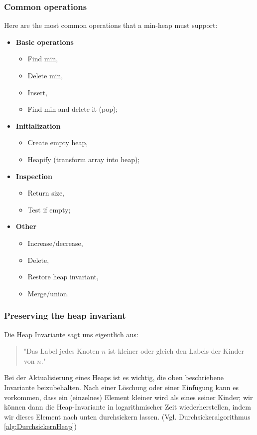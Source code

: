 \documentclass[a4paper]{article}
\begin{document}
\subsubsection*{Common operations} \label{common operations}
Here are the most common operations that a min-heap must support:
\begin{itemize}
\item \textbf{Basic operations}
  \begin{itemize}
  \item Find min,
  \item Delete min,
  \item Insert,
  \item Find min and delete it (pop);
  \end{itemize}
\item \textbf{Initialization}
  \begin{itemize}
  \item Create empty heap,
  \item Heapify (transform array into heap);
  \end{itemize}
\item\textbf{Inspection}
  \begin{itemize}
  \item Return size,
  \item Test if empty;
  \end{itemize}
\item \textbf{Other}
  \begin{itemize}
  \item Increase/decrease,
  \item Delete,
  \item Restore heap invariant,
  \item Merge/union.
  \end{itemize}
\end{itemize}


\subsubsection*{Preserving the heap invariant}
Die Heap Invariante sagt uns eigentlich aus: 
\begin{quote}
    "Das Label jedes Knoten $n$ ist kleiner oder gleich den Labels der Kinder von $n$."
\end{quote}
Bei der Aktualisierung eines Heaps ist es wichtig, die oben beschriebene Invariante beizubehalten. Nach einer Löschung oder einer Einfügung kann es vorkommen, dass ein (einzelnes) Element kleiner wird als eines seiner Kinder; wir können dann die Heap-Invariante in logarithmischer Zeit wiederherstellen, indem wir dieses Element nach unten durchsickern lassen. (Vgl. Durchsickeralgorithmus \ref{alg:DurchsickernHeap})
\end{document}
